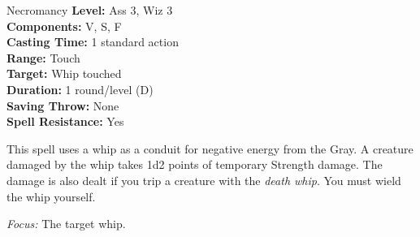 {Necromancy}
{
	\textbf{Level:}
	Ass 3, Wiz 3\\
	\textbf{Components:}
	V, S, F\\
	\textbf{Casting Time:}
	1 standard action\\
	\textbf{Range:}
	Touch\\
	\textbf{Target:}
	Whip touched\\
	\textbf{Duration:}
	1 round/level (D)\\
	\textbf{Saving Throw:}
	None\\
	\textbf{Spell Resistance:}
	Yes\\
}
{
	This spell uses a whip as a conduit for negative energy from the Gray. A creature damaged by the whip takes 1d2 points of temporary Strength damage. The damage is also dealt if you trip a creature with the \emph{death whip}. You must wield the whip yourself.

	\textit{Focus:} The target whip.
}

